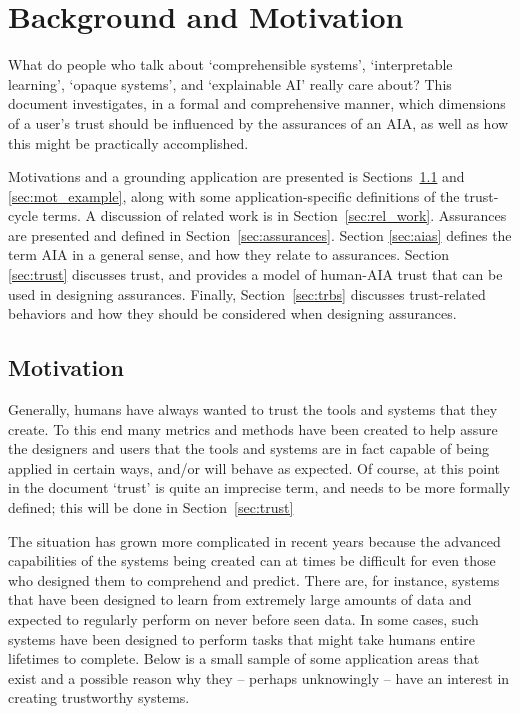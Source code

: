 \section{Background and Motivation} \label{sec:background}

What do people who talk about `comprehensible systems', `interpretable learning', `opaque systems', and `explainable AI' really care about? This document investigates, in a formal and comprehensive manner, which dimensions of a user's trust should be influenced by the assurances of an AIA, as well as how this might be practically accomplished.

Motivations and a grounding application are presented is Sections~\ref{sec:motivation} and \ref{sec:mot_example}, along with some application-specific definitions of the trust-cycle terms. A discussion of related work is in Section~\ref{sec:rel_work}. Assurances are presented and defined in Section~\ref{sec:assurances}.  Section \ref{sec:aias} defines the term AIA in a general sense, and how they relate to assurances. Section \ref{sec:trust} discusses trust, and provides a model of human-AIA trust that can be used in designing assurances. Finally, Section~\ref{sec:trbs} discusses trust-related behaviors and how they should be considered when designing assurances.

\subsection{Motivation} \label{sec:motivation}
    Generally, humans have always wanted to trust the tools and systems that they create.  To this end many metrics and methods have been created to help assure the designers and users that the tools and systems are in fact capable of being applied in certain ways, and/or will behave as expected. Of course, at this point in the document `trust' is quite an imprecise term, and needs to be more formally defined; this will be done in Section~\ref{sec:trust}

    The situation has grown more complicated in recent years because the advanced capabilities of the systems being created can at times be difficult for even those who designed them to comprehend and predict. There are, for instance, systems that have been designed to learn from extremely large amounts of data and expected to regularly perform on never before seen data. In some cases, such systems have been designed to perform tasks that might take humans entire lifetimes to complete. Below is a small sample of some application areas that exist and a possible reason why they -- perhaps unknowingly -- have an interest in creating trustworthy systems.

